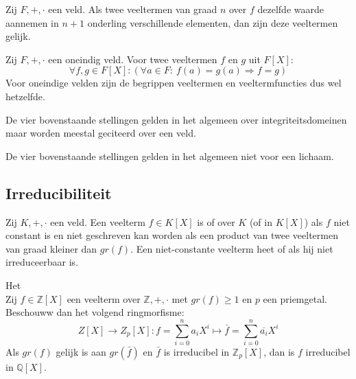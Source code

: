 \documentclass[main.tex]{subfiles}
\begin{document}
\begin{st}
  Zij $F,+,\cdot$ een veld.
  Als twee veeltermen van graad $n$ over $f$ dezelfde waarde aannemen in $n+1$ onderling verschillende elementen, dan zijn deze veeltermen gelijk.
\end{st}

\begin{st}
  Zij $F,+,\cdot$ een oneindig veld.
  Voor twee veeltermen $f$ en $g$ uit $F[X]$:
  \[ \forall f,g \in F[X]: (\forall a \in F:\ f(a) = g(a) \Rightarrow f = g) \]
  Voor oneindige velden zijn de begrippen veeltermen en veeltermfuncties dus wel hetzelfde.
\end{st}

\begin{opm}
  De vier bovenstaande stellingen gelden in het algemeen over integriteitsdomeinen maar worden meestal geciteerd over een veld.
\end{opm}

\begin{opm}
  De vier bovenstaande stellingen gelden in het algemeen niet voor een lichaam.
\end{opm}

\subsection{Irreducibiliteit}
\label{sec:irreducibiliteit}


\begin{de}
  Zij $K,+,\cdot$ een veld.
  Een veelterm $f\in K[X]$ is  of  over $K$ (of in $K[X]$) als $f$ niet constant is en niet geschreven kan worden als een product van twee veeltermen van graad kleiner dan $gr(f)$.
  Een niet-constante veelterm heet  of  als hij niet irreduceerbaar is.
\end{de}

\begin{ei}
  Het \\
  Zij $f\in \mathbb{Z}[X]$ een veelterm over $\mathbb{Z},+,\cdot$ met $gr(f) \ge 1$ en $p$ een priemgetal.
  Beschouww dan het volgend ringmorfisme:
  \[ Z[X] \rightarrow Z_{p}[X]: f = \sum_{i=0}^{n}a_{i}X^{i} \mapsto \bar{f} = \sum_{i=0}^{n}\overline{a_{i}}X^{i} \]
  Als $gr(f)$ gelijk is aan $gr(\bar{f})$ en $\bar{f}$ is irreducibel in $\mathbb{Z}_{p}[X]$, dan is $f$ irreducibel in $\mathbb{Q}[X]$.
\end{ei}
\end{document}
